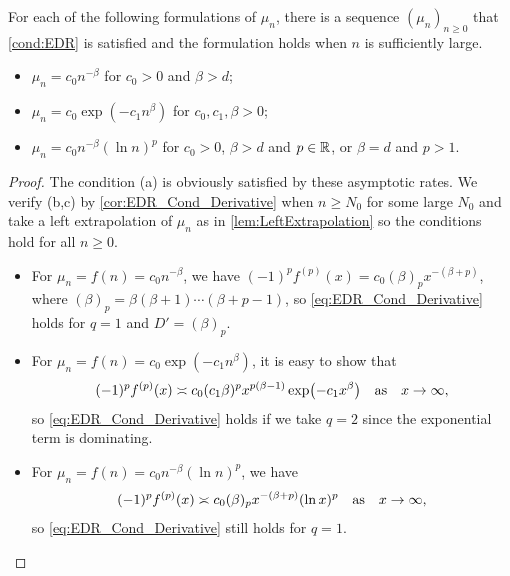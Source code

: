 \begin{proposition}
  For each of the following formulations of $\mu_n$,
  there is a sequence $(\mu_n)_{n\geq 0}$ that \cref{cond:EDR} is satisfied and the formulation holds when $n$ is sufficiently large.
  \begin{itemize}
    \item $\mu_n = c_0 n^{-\beta}$ for $c_0 > 0$ and $\beta > d$;
    \item $\mu_n = c_0 \exp(-c_1 n^{\beta})$ for $c_0,c_1,\beta > 0$;
    \item $\mu_n = c_0 n^{-\beta} (\ln n)^p$ for $c_0 > 0$, $\beta > d$ and $p \in \mathbb{R}$, or $\beta = d$ and $p > 1$.
  \end{itemize}
\end{proposition}
\begin{proof}
  The condition (a) is obviously satisfied by these asymptotic rates.
  We verify (b,c) by \cref{cor:EDR_Cond_Derivative} when $n \geq N_0$ for some large $N_0$ and take a left extrapolation of $\mu_n$
  as in \cref{lem:LeftExtrapolation} so the conditions hold for all $n \geq 0$.
  \begin{itemize}
    \item For $\mu_n = f(n)= c_0 n^{-\beta}$, we have $(-1)^p f^{(p)}(x) = c_0 (\beta)_p x^{-(\beta+p)}$,
    where $(\beta)_p = \beta (\beta+1)\cdots (\beta+p-1)$, so \cref{eq:EDR_Cond_Derivative} holds for $q=1$ and $D' = (\beta)_p$.
    \item For $\mu_n = f(n) = c_0 \exp(-c_1 n^{\beta})$, it is easy to show that
    \begin{align*}
    (-1)
      ^p f^{(p)}(x) \asymp c_0 (c_1 \beta)^p x^{p(\beta-1)} \exp(-c_1 x^{\beta}) \qq{as} x \to \infty,
    \end{align*}
    so \cref{eq:EDR_Cond_Derivative} holds if we take $q = 2$ since the exponential term is dominating.
    \item For $\mu_n = f(n) = c_0 n^{-\beta} (\ln n)^p$, we have
    \begin{align*}
    (-1)
      ^p f^{(p)}(x) \asymp c_0 (\beta)_p x^{-(\beta+p)} (\ln x)^{p} \qq{as} x \to \infty,
    \end{align*}
    so \cref{eq:EDR_Cond_Derivative} still holds for $q = 1$.
  \end{itemize}
\end{proof}



